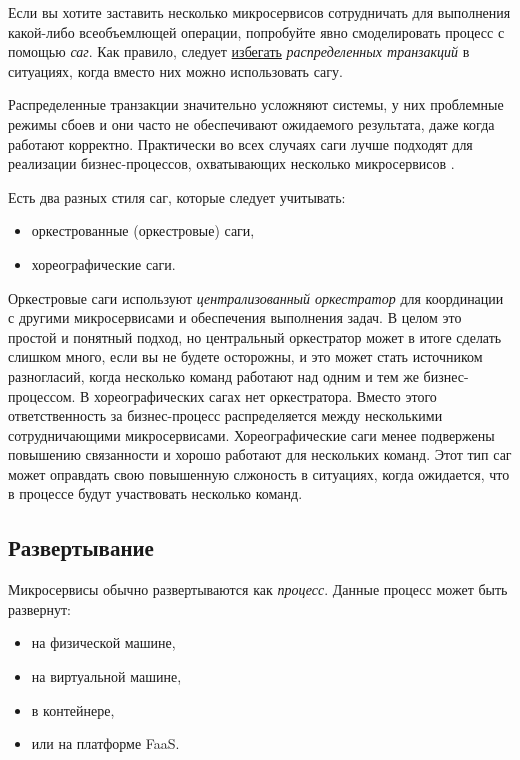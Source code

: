 \documentclass[%
	11pt,
	a4paper,
	utf8,
		]{article}
\begin{document}
Если вы хотите заставить несколько микросервисов сотрудничать для выполнения какой-либо всеобъемлющей операции, попробуйте явно смоделировать процесс с помощью \emph{саг}. {\color{red}Как правило, следует \underline{избегать} \emph{распределенных транзакций} в ситуациях, когда вместо них можно использовать сагу.}

Распределенные транзакции значительно усложняют системы, у них проблемные режимы сбоев и они часто не обеспечивают ожидаемого результата, даже когда работают корректно. Практически во всех случаях саги лучше подходят для реализации бизнес-процессов, охватывающих несколько микросервисов \cite[]{microservices-2024}.

Есть два разных стиля саг, которые следует учитывать:
\begin{itemize}
	\item оркестрованные (оркестровые) саги,
	
	\item хореографические саги.
\end{itemize}

Оркестровые саги используют \emph{централизованный оркестратор} для координации с другими микросервисами и обеспечения выполнения задач. В целом это простой и понятный подход, но центральный оркестратор может в итоге сделать слишком много, если вы не будете осторожны, и это может стать источником разногласий, когда несколько команд работают над одним и тем же бизнес-процессом. В хореографических сагах нет оркестратора. Вместо этого ответственность за бизнес-процесс распределяется между несколькими сотрудничающими микросервисами. Хореографические саги менее подвержены повышению связанности и хорошо работают для нескольких команд. Этот тип саг может оправдать свою повышенную слжоность в ситуациях, когда ожидается, что в процессе будут участвовать несколько команд.

\subsection{Развертывание}

Микросервисы обычно развертываются как \emph{процесс}. Данные процесс может быть развернут:
\begin{itemize}
	\item на физической машине,
	
	\item на виртуальной машине,
	
	\item в контейнере,
	
	\item или на платформе FaaS.
\end{itemize}
\end{document}
